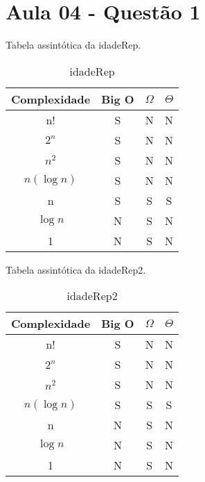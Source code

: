 \documentclass{article}
\begin{document}
\section{Aula 04 - Questão 1}

Tabela assintótica da idadeRep. 

\begin{table}[h!]
    \centering
    \begin{tabular}{|c|c|c|c|}
    \hline
    \textbf{Complexidade} & \textbf{Big O} & $\Omega$ & $\Theta$ \\ \hline
    n! & S & N & N \\ \hline
    $2^n$ & S & N & N \\ \hline
    $n^2$ & S & N & N \\ \hline
    $n(\log n)$ & S & N & N \\ \hline
    n & S & S & S \\ \hline
    $\log n$ & N & S & N \\ \hline
    1 & N & S & N \\ \hline 
    \end{tabular}
    \caption{idadeRep}
\end{table}

Tabela assintótica da idadeRep2. 

\begin{table}[h!]
    \centering
    \begin{tabular}{|c|c|c|c|}
    \hline
    \textbf{Complexidade} & \textbf{Big O} & $\Omega$ & $\Theta$ \\ \hline
    n! & S & N & N \\ \hline
    $2^n$ & S & N & N \\ \hline
    $n^2$ & S & N & N \\ \hline
    $n(\log n)$ & S & S & S \\ \hline
    n & N & S & N \\ \hline
    $\log n$ & N & S & N \\ \hline
    1 & N & S & N \\ \hline 
    \end{tabular}
    \caption{idadeRep2}
\end{table}
\end{document}
